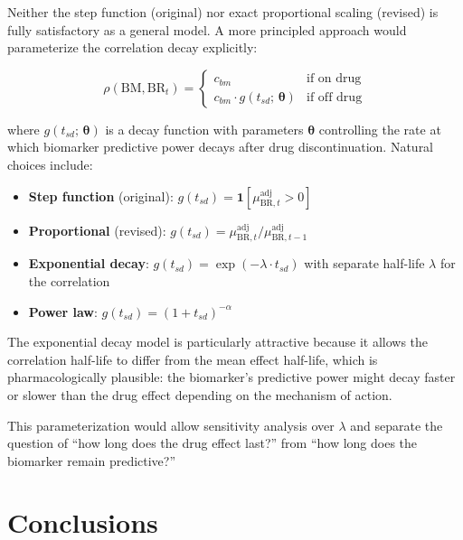 \documentclass[11pt]{article}
\begin{document}
Neither the step function (original) nor exact proportional
scaling (revised) is fully satisfactory as a general model.
A more principled approach would parameterize the correlation
decay explicitly:

\[
\rho(\text{BM}, \text{BR}_t) =
\begin{cases}
c_{bm} & \text{if on drug} \\[4pt]
c_{bm} \cdot g(t_{sd};\, \boldsymbol{\theta}) &
  \text{if off drug}
\end{cases}
\]

where $g(t_{sd};\, \boldsymbol{\theta})$ is a decay function
with parameters $\boldsymbol{\theta}$ controlling the rate
at which biomarker predictive power decays after drug
discontinuation. Natural choices include:

\begin{itemize}
\item \textbf{Step function} (original):
  $g(t_{sd}) = \mathbf{1}[\mu_{\text{BR},t}^{\text{adj}} > 0]$
\item \textbf{Proportional} (revised):
  $g(t_{sd}) = \mu_{\text{BR},t}^{\text{adj}} /
  \mu_{\text{BR},t-1}^{\text{adj}}$
\item \textbf{Exponential decay}:
  $g(t_{sd}) = \exp(-\lambda \cdot t_{sd})$ with separate
  half-life $\lambda$ for the correlation
\item \textbf{Power law}:
  $g(t_{sd}) = (1 + t_{sd})^{-\alpha}$
\end{itemize}

The exponential decay model is particularly attractive because
it allows the correlation half-life to differ from the mean
effect half-life, which is pharmacologically plausible: the
biomarker's predictive power might decay faster or slower
than the drug effect depending on the mechanism of action.

This parameterization would allow sensitivity analysis over
$\lambda$ and separate the question of ``how long does the
drug effect last?'' from ``how long does the biomarker remain
predictive?''

\section{Conclusions}
\end{document}
